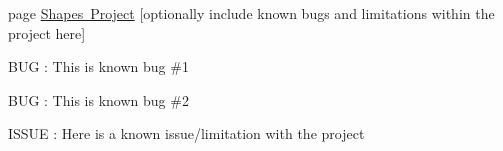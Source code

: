 
\begin{DoxyRefList}
\item[page \mbox{\hyperlink{index}{Shapes Project}} ]\label{bug__bug000001}%
%
\mbox{[}optionally include known bugs and limitations within the project here\mbox{]}
\begin{DoxyItemize}
\item B\+UG \+: This is known bug \#1
\item B\+UG \+: This is known bug \#2
\item I\+S\+S\+UE \+: Here is a known issue/limitation with the project
\end{DoxyItemize}
\end{DoxyRefList}